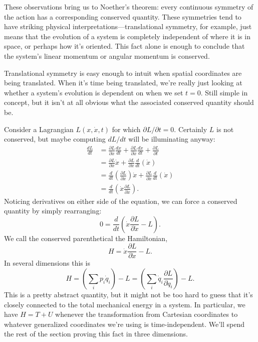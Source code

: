 \documentclass[../p111main.tex]{subfiles}
\begin{document}
These observations bring us to Noether's theorem: every continuous symmetry of the action has a corresponding conserved quantity.
These symmetries tend to have striking physical interpretations---translational symmetry, for example, just means that the evolution of a system is completely independent of where it is in space, or perhaps how it's oriented.
This fact alone is enough to conclude that the system's linear momentum or angular momentum is conserved.

Translational symmetry is easy enough to intuit when spatial coordinates are being translated.
When it's time being translated, we're really just looking at whether a system's evolution is dependent on when we set $t=0$.
Still simple in concept, but it isn't at all obvious what the associated conserved quantity should be.

Consider a Lagrangian $L(x, \dot x, t)$ for which $\partial L / \partial t = 0$.
Certainly $L$ is not conserved, but maybe computing $dL / dt$ will be illuminating anyway:
\begin{align*}
    \frac{d L}{d t} &= \frac{\partial L}{\partial x} \frac{dx}{dt} + \frac{\partial L}{\partial \dot x} \frac{d \dot x}{dt} + \frac{\partial L}{\partial t} \\
    &= \frac{\partial L}{\partial x} \dot x + \frac{\partial L}{\partial \dot x} \frac{d}{dt} (\dot x) \\
    &= \frac{d}{dt} \left( \frac{\partial L}{\partial \dot x} \right) \dot x + \frac{\partial L}{\partial \dot x} \frac{d}{dt} (\dot x) \\
    &= \frac{d}{dt} \left( \dot x \frac{\partial L}{\partial \dot x} \right).
\end{align*}
Noticing derivatives on either side of the equation, we can force a conserved quantity by simply rearranging:
\[ 0 = \frac{d}{dt} \left( \dot x \frac{\partial L}{\partial \dot x} - L \right). \]
We call the conserved parenthetical the Hamiltonian,
\[ H = \dot x \frac{\partial L}{\partial \dot x} - L. \]
In several dimensions this is
\[ H = \left( \sum_{i}^{} p_i \dot q_i \right) - L = \left( \sum_{i}^{} \dot q_i \frac{\partial L}{\partial \dot q_i} \right) - L. \]
This is a pretty abstract quantity, but it might not be too hard to guess that it's closely connected to the total mechanical energy in a system.
In particular, we have $H = T + U$ whenever the transformation from Cartesian coordinates to whatever generalized coordinates we're using is time-independent.
We'll spend the rest of the section proving this fact in three dimensions.
\end{document}
